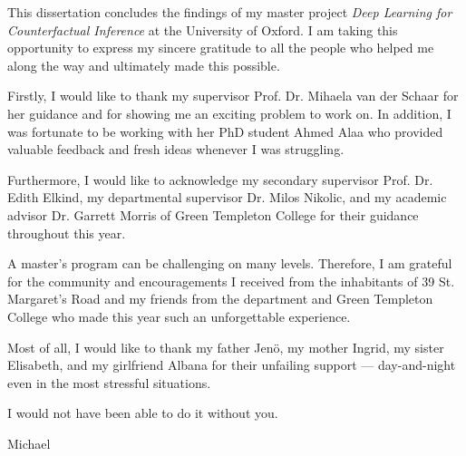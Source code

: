 

This dissertation concludes the findings of my master project \emph{Deep Learning for Counterfactual Inference} at the University of Oxford. I am taking this opportunity to express my sincere gratitude to all the people who helped me along the way and ultimately made this possible.

Firstly, I would like to thank my supervisor Prof. Dr. Mihaela van der Schaar for her guidance and for showing me an exciting problem to work on. In addition, I was fortunate to be working with her PhD student Ahmed Alaa who provided valuable feedback and fresh ideas whenever I was struggling. 

Furthermore, I would like to acknowledge my secondary supervisor Prof. Dr. Edith Elkind, my departmental supervisor Dr. Milos Nikolic, and  my academic advisor Dr. Garrett Morris of Green Templeton College for their guidance throughout this year. 

A master's program can be challenging on many levels. Therefore, I am grateful for the community and encouragements I received from the inhabitants of 39 St. Margaret's Road and my friends from the department and Green Templeton College who made this year such an unforgettable experience. 

Most of all, I would like to thank my father Jenö, my mother Ingrid, my sister Elisabeth, and my girlfriend Albana for their unfailing support  --- day-and-night even in the most stressful situations. 

I would not have been able to do it without you. 

\begin{flushright}
Michael 
\end{flushright}



